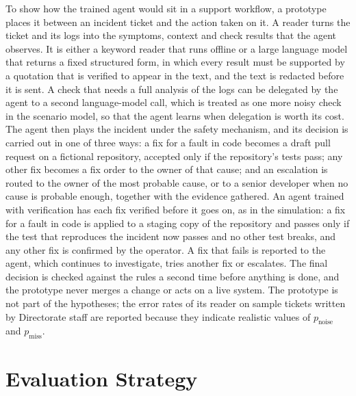 To show how the trained agent would sit in a support workflow, a prototype places it between an incident ticket and the action taken on it. A reader turns the ticket and its logs into the symptoms, context and check results that the agent observes. It is either a keyword reader that runs offline or a large language model that returns a fixed structured form, in which every result must be supported by a quotation that is verified to appear in the text, and the text is redacted before it is sent. A check that needs a full analysis of the logs can be delegated by the agent to a second language-model call, which is treated as one more noisy check in the scenario model, so that the agent learns when delegation is worth its cost. The agent then plays the incident under the safety mechanism, and its decision is carried out in one of three ways: a fix for a fault in code becomes a draft pull request on a fictional repository, accepted only if the repository's tests pass; any other fix becomes a fix order to the owner of that cause; and an escalation is routed to the owner of the most probable cause, or to a senior developer when no cause is probable enough, together with the evidence gathered. An agent trained with verification has each fix verified before it goes on, as in the simulation: a fix for a fault in code is applied to a staging copy of the repository and passes only if the test that reproduces the incident now passes and no other test breaks, and any other fix is confirmed by the operator. A fix that fails is reported to the agent, which continues to investigate, tries another fix or escalates. The final decision is checked against the rules a second time before anything is done, and the prototype never merges a change or acts on a live system. The prototype is not part of the hypotheses; the error rates of its reader on sample tickets written by Directorate staff are reported because they indicate realistic values of $p_{\text{noise}}$ and $p_{\text{miss}}$.

\section{Evaluation Strategy}
\label{sec:evaluation}

